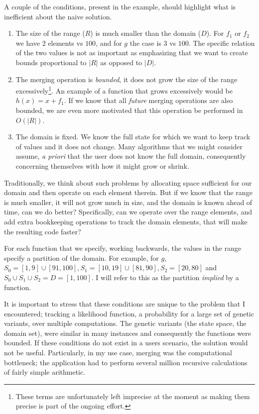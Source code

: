 \documentclass{article}
\begin{document}
A couple of the conditions,
present in the example,
should highlight what is inefficient about the naive solution.
\begin{enumerate}
  \item The size of the range ($R$) is much smaller than the domain ($D$).
    For $f_{1}$ or $f_{2}$ we have 2 elements vs $100$,
    and for $g$ the case is $3$ vs $100$.
    The specific relation of the two values is not as important as emphasizing
    that we want to create bounds proportional to $|R|$ as opposed to $|D|$.

  \item The merging operation is \emph{bounded},
    it does not grow the size of the range excessively\footnote{These terms are
    unfortunately left imprecise at the moment as making them precise is part of
    the ongoing effort.}.
    An example of a function that grows excessively would be $h(x) = x + f_{1}$.
    If we know that all \emph{future} merging operations are also bounded,
    we are even more motivated that this operation be performed in
    $O(|R|)$.

  \item The domain is fixed.
    We know the full state for which we want to keep track of values and it
    does not change.
    Many algorithms that we might consider assume, \emph{a priori} that the
    user does not know the full domain,
    consequently concerning themselves with how it might grow or shrink.

\end{enumerate}

Traditionally,
we think about such problems by allocating space sufficient for our domain
and then operate on each element therein.
But if we know that the range is much smaller,
it will not grow much in size,
and the domain is known ahead of time,
can we do better?
Specifically,
can we operate over the range elements,
and add extra bookkeeping operations to track the domain elements,
that will make the resulting code faster?

For each function that we specify,
working backwards,
the values in the range specify a partition of the domain.
For example,
for $g$, $S_{0} = [1,9]\cup [91,100], S_{1} = [10,19] \cup [81,90], S_{2} = [20,80]$
and $S_{0} \cup S_{1} \cup S_{2} = D = [1,100]$.
I will refer to this as the partition \emph{implied} by a function.


It is important to stress that these conditions are unique to the problem that
I encountered;
tracking a likelihood function,
a probability for a large set of genetic variants,
over multiple computations.
The genetic variants (the state space, the domain set),
were similar in many instances and consequently the functions were bounded.
If these conditions do not exist in a users scenario,
the solution would not be useful.
Particularly, in my use case, merging was the computational bottleneck;
the application had to perform several million recursive calculations of fairly
simple arithmetic.
\end{document}
